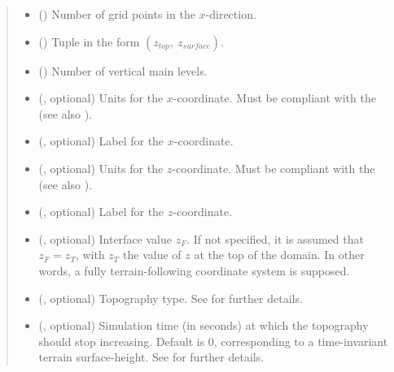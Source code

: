 \documentclass[letterpaper,10pt,english]{sphinxmanual}
\begin{document}
\begin{fulllineitems}
\begin{fulllineitems}
\begin{quote}
\begin{description}
\begin{itemize}
\item {} 
 () \textendash{} Number of grid points in the \(x\)-direction.

\item {} 
 () \textendash{} Tuple in the form \((z_{top}, ~ z_{surface})\).

\item {} 
 () \textendash{} Number of vertical main levels.

\item {} 
 (, optional) \textendash{} 
Units for the \(x\)-coordinate. Must be compliant
with the  (see also
{\hyperref[\detokenize{api:grids.axis.Axis.__init__}]{}}).


\item {} 
 (, optional) \textendash{} Label for the \(x\)-coordinate.

\item {} 
 (, optional) \textendash{} 
Units for the \(z\)-coordinate. Must be compliant
with the  (see also
{\hyperref[\detokenize{api:grids.axis.Axis.__init__}]{}}).


\item {} 
 (, optional) \textendash{} Label for the \(z\)-coordinate.

\item {} 
 (, optional) \textendash{} Interface value \(z_F\). If not specified,
it is assumed that \(z_F = z_T\), with \(z_T\) the value of \(z\)
at the top of the domain. In other words, a fully terrain-following coordinate
system is supposed.

\item {} 
 (, optional) \textendash{} Topography type. See {\hyperref[\detokenize{api:module-grids.topography}]{}}
for further details.

\item {} 
 (, optional) \textendash{} Simulation time (in seconds) at which the topography
should stop increasing. Default is 0, corresponding to a time-invariant terrain
surface-height. See  for further details.


\end{itemize}
\end{description}
\end{quote}
\end{fulllineitems}
\end{fulllineitems}
\end{document}

